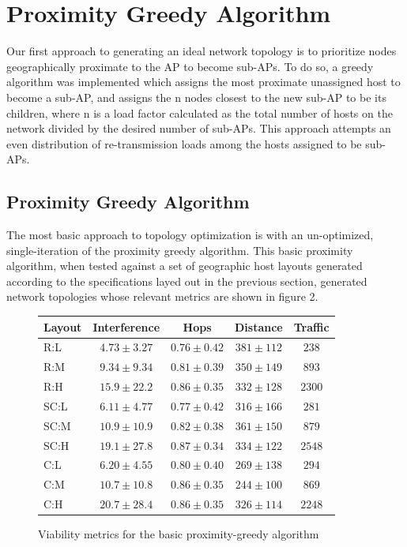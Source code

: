 \documentclass{sigcomm-alternate}
\begin{document}
\section{Proximity Greedy Algorithm}
Our first approach to generating an ideal network topology is to prioritize nodes geographically proximate to the AP to become sub-APs. To do so, a greedy algorithm was implemented which assigns the most proximate unassigned host to become a sub-AP, and assigns the n nodes closest to the new sub-AP to be its children, where n is a load factor calculated as the total number of hosts on the network divided by the desired number of sub-APs. This approach attempts an even distribution of re-transmission loads among the hosts assigned to be sub-APs.

\subsection{Proximity Greedy Algorithm}
The most basic approach to topology optimization is with an un-optimized, single-iteration of the proximity greedy algorithm. This basic proximity algorithm, when tested against a set of geographic host layouts generated according to the specifications layed out in the previous section, generated network topologies whose relevant metrics are shown in figure 2.

\begin{figure}[H]
  \centering
  
    \begin{tabular}{|l || c | c | c | c|}
    \hline
    Layout & Interference & Hops & Distance & Traffic \\
    \hline
    R:L & $4.73 \pm 3.27$ & $0.76 \pm 0.42$ & $381 \pm 112$ & $238$ \\
    R:M & $9.34 \pm 9.34$ & $0.81 \pm 0.39$ & $350 \pm 149$ & $893$ \\
    R:H & $15.9 \pm 22.2$ & $0.86 \pm 0.35$ & $332 \pm 128$ & $2300$ \\
    \hline
    SC:L & $6.11 \pm 4.77$ & $0.77 \pm 0.42$ & $316 \pm 166$ & $281$ \\
    SC:M & $10.9 \pm 10.9$ & $0.82 \pm 0.38$ & $361 \pm 150$ & $879$ \\
    SC:H & $19.1 \pm 27.8$ & $0.87 \pm 0.34$ & $334 \pm 122$ & $2548$ \\
    \hline
    C:L & $6.20 \pm 4.55$ & $0.80 \pm 0.40$ & $269 \pm 138$ & $294$ \\
    C:M & $10.7 \pm 10.8$ & $0.86 \pm 0.35$ & $244 \pm 100$ & $869$ \\
    C:H & $20.7 \pm 28.4$ & $0.86 \pm 0.35$ & $326 \pm 114$ & $2248$ \\
    \hline
    \end{tabular}
  
  \caption{Viability metrics for the basic proximity-greedy algorithm}
\end{figure}
\end{document}
